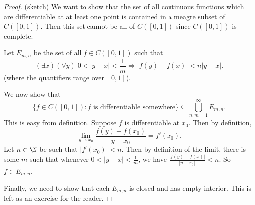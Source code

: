\documentclass[a4paper]{article}
\begin{document}
\begin{proof}(sketch)
  We want to show that the set of all continuous functions which are differentiable at at least one point is contained in a meagre subset of $C([0, 1])$. Then this set cannot be all of $C([0, 1])$ since $C([0, 1])$ is complete.

  Let $E_{m, n}$ be the set of all $f \in C([0, 1])$ such that
  \[
    (\exists x)(\forall y)\; 0 < |y - x| < \frac{1}{m} \Rightarrow |f(y) - f(x)| < n|y - x|.
  \]
  (where the quantifiers range over $[0, 1]$).

  We now show that
  \[
    \{f \in C([0, 1]): f\text{ is differentiable somewhere}\} \subseteq \bigcup_{n, m = 1}^\infty E_{m, n}.
  \]
  This is easy from definition. Suppose $f$ is differentiable at $x_0$. Then by definition,
  \[
    \lim_{y \to x_0} \frac{f(y) - f(x_0)}{y - x_0} = f'(x_0).
  \]
  Let $n \in \N$ be such that $|f'(x_0)| < n$. Then by definition of the limit, there is some $m$ such that whenever $0 < |y - x| < \frac{1}{m}$, we have $\frac{|f(y) - f(x)|}{|y - x_0|} < n$. So $f \in E_{m, n}$.

  Finally, we need to show that each $E_{m, n}$ is closed and has empty interior. This is left as an exercise for the reader. %
\end{proof}
\end{document}
